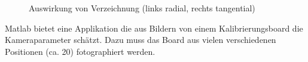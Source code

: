\begin{figure}[ht]
\centering
    \caption{Auswirkung von Verzeichnung (links radial, rechts tangential) \cite{Verlag}}
\end{figure}

Matlab bietet eine Applikation die aus Bildern von einem Kalibrierungsboard die Kameraparameter schätzt. Dazu muss das Board aus vielen verschiedenen Positionen (ca. 20) fotographiert werden. 

